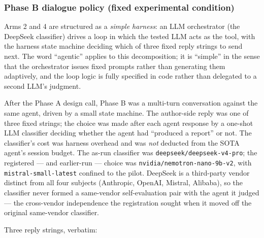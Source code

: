 \documentclass[a4paper,11pt]{article}
\begin{document}
\subsubsection*{Phase B dialogue policy (fixed experimental
condition)}

Arms 2 and 4 are structured as a \emph{simple harness}: an LLM
orchestrator (the DeepSeek classifier) drives a loop in which the tested
LLM acts as the tool, with the harness state machine deciding which of
three fixed reply strings to send next. The word ``agentic'' applies to
this decomposition; it is ``simple'' in the sense that the orchestrator
issues fixed prompts rather than generating them adaptively, and the
loop logic is fully specified in code rather than delegated to a second
LLM's judgment.

After the Phase A design call, Phase B was a multi-turn conversation
against the same agent, driven by a small state machine. The author-side
reply was one of three fixed strings; the choice was made after each
agent response by a one-shot LLM classifier deciding whether the agent
had ``produced a report'' or not. The classifier's cost was harness
overhead and was \emph{not} deducted from the SOTA agent's session
budget. The as-run classifier was \texttt{deepseek/deepseek-v4-pro}; the
registered --- and earlier-run --- choice was
\texttt{nvidia/nemotron-nano-9b-v2}, with \texttt{mistral-small-latest}
confined to the pilot. DeepSeek is a third-party vendor distinct from
all four subjects (Anthropic, OpenAI, Mistral, Alibaba), so the
classifier never formed a same-vendor self-evaluation pair with the
agent it judged --- the cross-vendor independence the registration
sought when it moved off the original same-vendor classifier.

Three reply strings, verbatim:
\end{document}
